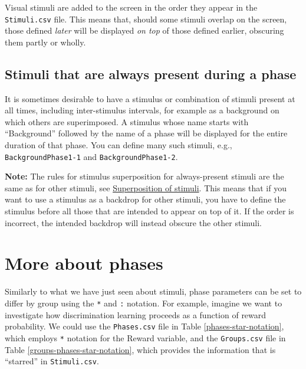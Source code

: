 \documentclass[11pt,]{article}
\begin{document}

Visual stimuli are added to the screen in the order they appear in the
\texttt{Stimuli.csv} file. This means that, should some stimuli overlap
on the screen, those defined \emph{later} will be displayed \emph{on
top} of those defined earlier, obscuring them partly or wholly.

\subsection{Stimuli that are always present during a
phase}\label{stimuli-that-are-always-present-during-a-phase}

It is sometimes desirable to have a stimulus or combination of stimuli
present at all times, including inter-stimulus intervals, for example as
a background on which others are superimposed. A stimulus whose name
starts with ``Background'' followed by the name of a phase will be
displayed for the entire duration of that phase. You can define many
such stimuli, e.g., \texttt{BackgroundPhase1-1} and
\texttt{BackgroundPhase1-2}.

\textbf{Note:} The rules for stimulus superposition for always-present
stimuli are the same as for other stimuli, see
\hyperref[stimulus-superposition]{Superposition of stimuli}. This means
that if you want to use a stimulus as a backdrop for other stimuli, you
have to define the stimulus before all those that are intended to appear
on top of it. If the order is incorrect, the intended backdrop will
instead obscure the other stimuli.

\section{More about phases}\label{more-about-phases}

Similarly to what we have just seen about stimuli, phase parameters can
be set to differ by group using the \texttt{*} and \texttt{:} notation.
For example, imagine we want to investigate how discrimination learning
proceeds as a function of reward probability. We could use the
\texttt{Phases.csv} file in Table \ref{phases-star-notation}, which
employs \texttt{*} notation for the Reward variable, and the
\texttt{Groups.csv} file in Table \ref{groups-phases-star-notation},
which provides the information that is ``starred'' in
\texttt{Stimuli.csv}.
\end{document}
